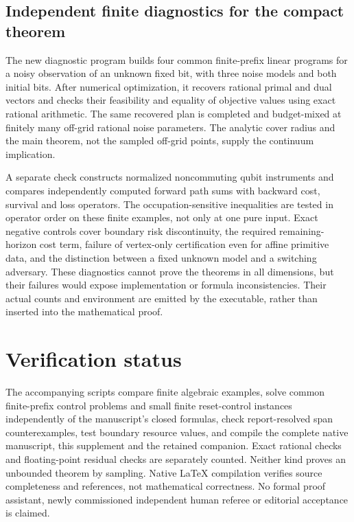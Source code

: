 \subsection{Independent finite diagnostics for the compact theorem}
The new diagnostic program builds four common finite-prefix linear programs for a noisy observation of an unknown fixed bit, with three noise models and both initial bits. After numerical optimization, it recovers rational primal and dual vectors and checks their feasibility and equality of objective values using exact rational arithmetic. The same recovered plan is completed and budget-mixed at finitely many off-grid rational noise parameters. The analytic cover radius and the main theorem, not the sampled off-grid points, supply the continuum implication.

A separate check constructs normalized noncommuting qubit instruments and compares independently computed forward path sums with backward cost, survival and loss operators. The occupation-sensitive inequalities are tested in operator order on these finite examples, not only at one pure input. Exact negative controls cover boundary risk discontinuity, the required remaining-horizon cost term, failure of vertex-only certification even for affine primitive data, and the distinction between a fixed unknown model and a switching adversary. These diagnostics cannot prove the theorems in all dimensions, but their failures would expose implementation or formula inconsistencies. Their actual counts and environment are emitted by the executable, rather than inserted into the mathematical proof.











\section{Verification status}
The accompanying scripts compare finite algebraic examples, solve common finite-prefix control problems and small finite reset-control instances independently of the manuscript's closed formulas, check report-resolved span counterexamples, test boundary resource values, and compile the complete native manuscript, this supplement and the retained companion. Exact rational checks and floating-point residual checks are separately counted. Neither kind proves an unbounded theorem by sampling. Native LaTeX compilation verifies source completeness and references, not mathematical correctness. No formal proof assistant, newly commissioned independent human referee or editorial acceptance is claimed.



